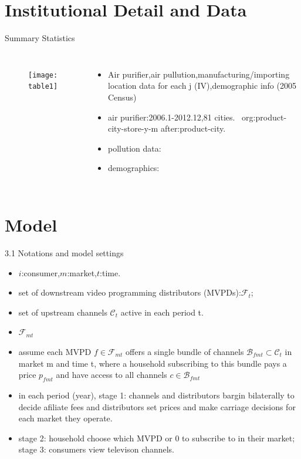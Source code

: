 \documentclass[10pt]{beamer}
\begin{document}
\section{Institutional Detail and Data}
\begin{frame}{Summary Statistics}
    \begin{columns}[c] 
    \column{9cm}
    \begin{figure}
        \centering
        \texttt{[image: table1]}
    \end{figure}
    \column{4cm}
    \begin{itemize}
        \item Air purifier,air pullution,manufacturing/importing location data for each j (IV),demographic info (2005 Census)
        \item air purifier:2006.1-2012.12,81 cities. \ org:product-city-store-y-m after:product-city.
        \item pollution data:
        \item demographics: 
    \end{itemize}
	\end{columns}
\end{frame}

\section{Model}
\begin{frame}{3.1 Notations and model settings}
    \begin{itemize}
        \item $i$:consumer,$m$:market,$t$:time.
        \item set of downstream video programming distributors (MVPDs):$\mathcal{F}_{t}$;
        \item set of upstream channels $\mathcal{C}_t$ active in each period t.
        \item $\mathcal{F}_{mt}$
        \item assume each MVPD $f \in \mathcal{F}_{mt}$ offers a single bundle of channels $\mathcal{B}_{fmt} \subset \mathcal{C}_t$ in market m and time t, where a household subscribing to this bundle pays a price $p_{fmt}$ and have access to all channels $c \in \mathcal{B}_{fmt}$
        \item in each period (year), stage 1: channels and distributors bargin bilaterally to decide afiliate fees and distributors set prices and make carriage decisions for each market they operate.
        \item stage 2: household choose which MVPD or 0 to subscribe to in their market; stage 3: consumers view televison channels.
    \end{itemize}
\end{frame}
\end{document}
